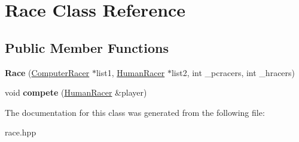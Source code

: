 \hypertarget{classRace}{}\section{Race Class Reference}
\label{classRace}
\subsection*{Public Member Functions}
\begin{DoxyCompactItemize}
\item 
{\bfseries Race} (\hyperlink{classComputerRacer}{Computer\+Racer} $\ast$list1, \hyperlink{classHumanRacer}{Human\+Racer} $\ast$list2, int \+\_\+pcracers, int \+\_\+hracers)\hypertarget{classRace_aba8a6eef6e441e74ac136e2a793deb1c}{}\label{classRace_aba8a6eef6e441e74ac136e2a793deb1c}

\item 
void {\bfseries compete} (\hyperlink{classHumanRacer}{Human\+Racer} \&player)\hypertarget{classRace_a54a589faa718093ecc2a2447a58facc9}{}\label{classRace_a54a589faa718093ecc2a2447a58facc9}

\end{DoxyCompactItemize}


The documentation for this class was generated from the following file\+:\begin{DoxyCompactItemize}
\item 
race.\+hpp\end{DoxyCompactItemize}
